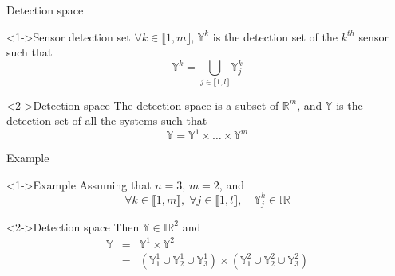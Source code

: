 \documentclass{beamer}
\begin{document}
            \begin{frame}{Detection space}
                \begin{block}<1->{Sensor detection set}
                    $\forall k \in \llbracket 1, m\rrbracket$, $\mathbb{Y}^k$ is the detection set of the $k^{th}$ sensor such that
                    \begin{equation}
                        \mathbb{Y}^k = \bigcup_{j \in \llbracket 1, l\rrbracket} \mathbb{Y}_j^k
                    \end{equation}
                \end{block}
                \begin{block}<2->{Detection space}
                    The detection space is a subset of $\mathbb{R}^m$, and $\mathbb{Y}$ is the detection set of all the systems such that
                    \begin{equation}
                        \mathbb{Y} = \mathbb{Y}^1 \times \dots \times \mathbb{Y}^m
                    \end{equation}
                \end{block}
            \end{frame}

            \begin{frame}{Example}
                \begin{exampleblock}<1->{Example}
                    Assuming that $n = 3$, $m = 2$, and
                    $$\forall k \in \llbracket 1, m\rrbracket, \;  \forall j \in \llbracket 1, l\rrbracket, \quad \mathbb{Y}_j^k \in \mathbb{IR}$$
                \end{exampleblock}
                \begin{exampleblock}<2->{Detection space}
                    Then $\mathbb{Y} \in \mathbb{IR}^2$ and
                    \begin{eqnarray}
                        \mathbb{Y} & = & \mathbb{Y}^1 \times \mathbb{Y}^2 \\
                        & = & \left(\mathbb{Y}_1^1 \cup \mathbb{Y}_2^1 \cup \mathbb{Y}_3^1\right) \times \left(\mathbb{Y}_1^2 \cup \mathbb{Y}_2^2 \cup \mathbb{Y}_3^2\right)
                    \end{eqnarray}
                \end{exampleblock}
            \end{frame}
\end{document}
